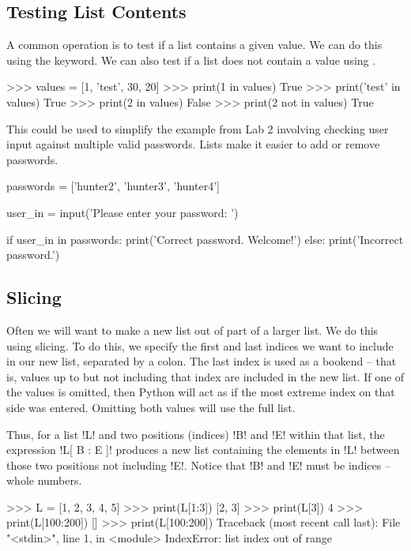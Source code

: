 \documentclass[11pt]{cselabheader}
\begin{document}
\subsection{Testing List Contents}
A common operation is to test if a list contains a given value. We can do this
using the  keyword. We can also test if a list does not contain a
value using .

\begin{pyconcode}
>>> values = [1, 'test', 30, 20]
>>> print(1 in values)
True
>>> print('test' in values)
True
>>> print(2 in values)
False
>>> print(2 not in values)
True
\end{pyconcode}

This could be used to simplify the example from Lab 2 involving checking user
input against multiple valid passwords. Lists make it easier to add or remove
passwords.

\begin{python3code}
passwords = ['hunter2', 'hunter3', 'hunter4']

user_in = input('Please enter your password: ')

if user_in in passwords:
    print('Correct password. Welcome!')
else:
    print('Incorrect password.')
\end{python3code}

\subsection{Slicing}
Often we will want to make a new list out of part of a larger list. We do this
using slicing. To do this, we specify the first and last indices we want to
include in our new list, separated by a colon. The last index is used as a
bookend -- that is, values up to but not including that index are included in
the new list. If one of the values is omitted, then Python will act as if the
most extreme index on that side was entered. Omitting both values will use the
full list.

Thus, for a list \pythoninline!L! and two positions (indices) \pythoninline!B! and
\pythoninline!E! within that list, the expression \pythoninline!L[ B : E ]! produces a
new list containing the elements in \pythoninline!L! between those two positions
not including \pythoninline!E!. Notice that \pythoninline!B! and \pythoninline!E! must be
indices -- whole numbers.

\begin{pyconcode}
>>> L = [1, 2, 3, 4, 5]
>>> print(L[1:3])
[2, 3]
>>> print(L[3])
4
>>> print(L[100:200])
[]
>>> print(L[100:200])
Traceback (most recent call last):
  File "<stdin>", line 1, in <module>
  IndexError: list index out of range
\end{pyconcode}
\end{document}
